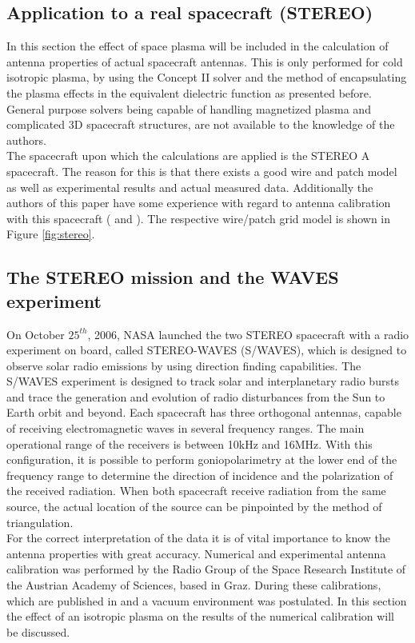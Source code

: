 \documentclass[draft,ras]{agutex}
\begin{document}
\begin{article}
\section{Application to a real spacecraft (STEREO)}
In this section the effect of space plasma will be included in the calculation of antenna properties of actual spacecraft antennas. This is only performed for cold isotropic plasma, by using the Concept II solver and the method of encapsulating the plasma effects in the equivalent dielectric function as presented before. General purpose solvers being capable of handling magnetized plasma and complicated 3D spacecraft structures, are not available to the knowledge of the authors. \\

The spacecraft upon which the calculations are applied is the STEREO A spacecraft. The reason for this is that there exists a good wire and patch model as well as experimental results and actual measured data. Additionally the authors of this paper have some experience with regard to antenna calibration with this spacecraft (\cite{ossi09} and \cite{panchenko10}). The respective wire/patch grid model is shown in Figure \ref{fig:stereo}.\\

\subsection{The STEREO mission and the WAVES experiment}
On October $25^{th}$, 2006, NASA launched the two STEREO spacecraft with a radio experiment on board, called STEREO-WAVES (S/WAVES), which is designed to observe solar radio emissions by using direction finding capabilities. The S/WAVES experiment is designed to track solar and interplanetary radio bursts and trace the generation and evolution of radio disturbances from the Sun to Earth orbit and beyond. Each spacecraft has three orthogonal antennas, capable of receiving electromagnetic waves in several frequency ranges. The main operational range of the receivers is between 10kHz and 16MHz. With this configuration, it is possible to perform goniopolarimetry at the lower end of the frequency range to determine the direction of incidence and the polarization of the received radiation. When both spacecraft receive radiation from the same source, the actual location of the source can be pinpointed by the method of triangulation.\\

For the correct interpretation of the data it is of vital importance to know the antenna properties with great accuracy. Numerical and experimental antenna calibration was performed by the Radio Group of the Space Research Institute of the Austrian Academy of Sciences, based in Graz. During these calibrations, which are published in \cite{ossi09} and \cite{macher07} a vacuum environment was postulated. In this section the effect of an isotropic plasma on the results of the numerical calibration will be discussed.\\


\end{article}
\end{document}
